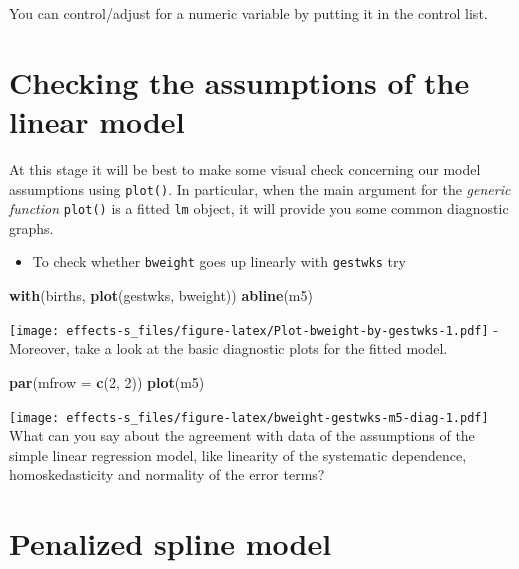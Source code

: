 \documentclass[
]{book}
\newenvironment{Shaded}{\begin{snugshade}}{\end{snugshade}}
\newcommand{\AttributeTok}[1]{\textcolor[rgb]{0.13,0.29,0.53}{#1}}
\newcommand{\DecValTok}[1]{\textcolor[rgb]{0.00,0.00,0.81}{#1}}
\newcommand{\FunctionTok}[1]{\textcolor[rgb]{0.13,0.29,0.53}{\textbf{#1}}}
\newcommand{\NormalTok}[1]{#1}
\providecommand{\tightlist}{%
  \setlength{\itemsep}{0pt}\setlength{\parskip}{0pt}}
\begin{document}
You can control/adjust for a numeric variable by putting it in the control list.

\section{Checking the assumptions of the linear model}\label{checking-the-assumptions-of-the-linear-model}

At this stage it will be best to make some visual check concerning
our model assumptions using \texttt{plot()}. In particular, when the main argument
for the \emph{generic function} \texttt{plot()} is a fitted \texttt{lm} object,
it will provide you some common diagnostic graphs.

\begin{itemize}
\tightlist
\item
  To check whether \texttt{bweight} goes up linearly with \texttt{gestwks} try
\end{itemize}

\begin{Shaded}
\begin{Highlighting}[]
\FunctionTok{with}\NormalTok{(births, }\FunctionTok{plot}\NormalTok{(gestwks, bweight))}
\FunctionTok{abline}\NormalTok{(m5)}
\end{Highlighting}
\end{Shaded}

\texttt{[image: effects-s\_files/figure-latex/Plot-bweight-by-gestwks-1.pdf]}
- Moreover, take a look at the basic diagnostic plots for the fitted model.

\begin{Shaded}
\begin{Highlighting}[]
\FunctionTok{par}\NormalTok{(}\AttributeTok{mfrow =} \FunctionTok{c}\NormalTok{(}\DecValTok{2}\NormalTok{, }\DecValTok{2}\NormalTok{))}
\FunctionTok{plot}\NormalTok{(m5)}
\end{Highlighting}
\end{Shaded}

\texttt{[image: effects-s\_files/figure-latex/bweight-gestwks-m5-diag-1.pdf]}
What can you say about the agreement with data of the assumptions of the
simple linear regression model,
like linearity of the systematic dependence,
homoskedasticity and normality of the error terms?

\section{Penalized spline model}\label{penalized-spline-model}
\end{document}

